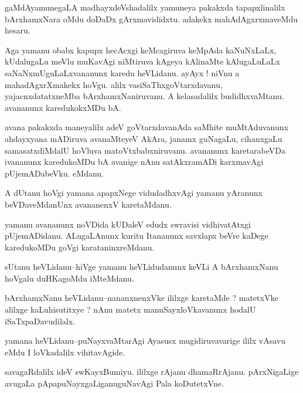 \documentclass{article}
\begin{document}
\begin{mn}%
gaMdAyamunegaLA madhayxdeVshadalilx yamuneya pakakxda tapapxlinalilx bArxhamxNara oMdu 
doDaDx gArxmavididxtu. adakekx mahAdAgxrxmaveMdu hesaru.
\end{mn}

\begin{mn}%
Aga yamanu obabx kapupx hecAcxgi keMcagiruva keMpAda kaNuNxLaLx, kUdalugaLu meVlu muKavAgi 
niMtiruva kAgeya kAlinaMte kAlugaLuLaLx saNaNxmUguLaLxvananunx karedu heVLidanu. ayAyx ! 
niVnu a mahadAgxrXmakekx hoVgu. alilx vasiSaThxgoVtarxdavanu, yajacnxdatatxneMba 
bArxhamxNaniruvanu. A kelasadalilx budidhxvaMtanu. avananunx karedukokxMDu bA.
\end{mn}

\begin{mn}%
avana pakakxda maneyalilx adeV goVtarxdavanAda saMhite muMtAduvanunx ahdayxyana mADiruva 
avanaMteyeV AkAra, janamx guNagaLu, cihanxgaLu samasatxdiMdalU hoVluva 
matoVtxbabxniruvanu. avananunx karetarabeVDa ivananunx karedukoMDu bA avanige nAnu 
satAkxramADi karxmavAgi pUjemADabeVku. eMdanu.
\end{mn}

\begin{mn}%
A dUtanu hoVgi yamana apapxNege vidudadhxvAgi yamanu yAranunx beVDaveMdanUnx avananenxV 
karetaMdanu.
\end{mn}

\begin{mn}%
yamanu avananunx noVDida kUDaleV edudx swravisi vidhivatAtxgi pUjemADidanu. ALugaLAnunx 
kuritu Itananunx savxlapx beVre kaDege  karedukoMDu goVgi karataninxreMdanu.
\end{mn}

\begin{mn}%
sUtanu heVLidanu--hiVge yamanu heVLidudanunx keVLi A bArxhamxNanu hoVgalu duHKagoMdu 
iMteMdanu.
\end{mn}

\begin{mn}%
bArxhamxNanu heVLidanu--nananxnenxVke ililxge karetaMde ? matetxVke alilxge kaLuhisutitxye 
? nAnu matetx manuSayxloVkavanunx hodalU iSaTxpaDavudilalx.
\end{mn}

\begin{mn}%
yamana heVLidanu--puNayxvaMtarAgi Ayasusx mugidiruvavarige ililx vAsavu eMdu I loVkadalilx 
vihitavAgide.
\end{mn}

\begin{mn}%
savagaRdalilx ideV swKayxBumiyu. ililxge rAjanu dhamaRrAjanu. pArxNigaLige avugaLa 
pApapuNayxgaLiganuguNavAgi Pala koDutetxVne.
\end{mn}
\end{document}
